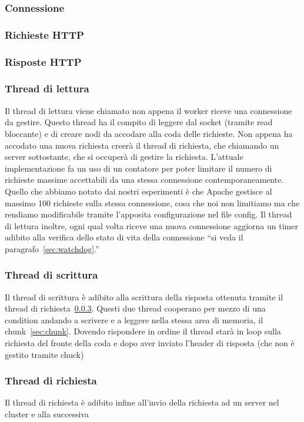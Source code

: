 \documentclass[italian]{tktltiki2}
\begin{document}
\subsubsection*{Connessione}
\subsubsection*{Richieste HTTP}
\subsubsection*{Risposte HTTP}
\subsubsection{Thread di lettura}
\label{sec:reader}
Il thread di lettura viene chiamato non appena il worker riceve una connessione da gestire. Questo thread ha il compito di leggere dal socket (tramite read bloccante) e di creare nodi da accodare alla coda delle richieste. Non appena ha accodato una nuova richiesta creerà il thread di richiesta, che chiamando un server sottostante, che si occuperà di gestire la richiesta. L'attuale implementazione fa un uso di un contatore per poter limitare il numero di richieste massime accettabili da una stessa connessione contemporaneamente. Quello che abbiamo notato dai nostri esperimenti è che Apache gestisce al massimo 100 richieste sulla stessa connessione, cosa che noi non limitiamo ma che rendiamo modificabile tramite l'apposita configurazione nel file config.
Il thread di lettura inoltre, ogni qual volta riceve una nuova connessione aggiorna un timer adibito alla verifica dello stato di vita della connessione ``si veda il paragrafo~\ref{sec:watchdog}.''
\subsubsection{Thread di scrittura}
\label{sec:writer}
Il thread di scrittura è adibito alla scrittura della risposta ottenuta tramite il thread di richiesta~\ref{sec:request}. Questi due thread cooperano per mezzo di una condition andando a scrivere e a leggere nella stessa area di memoria, il chunk~\ref{sec:chunk}. Dovendo rispondere in ordine il thread starà in loop sulla richiesta del fronte della coda e dopo aver inviato l'header di risposta (che non è gestito tramite chuck) 
\subsubsection{Thread di richiesta}
\label{sec:request}
Il thread di richiesta è adibito infine all'invio della richiesta ad un server nel cluster e alla successiva 
\end{document}
